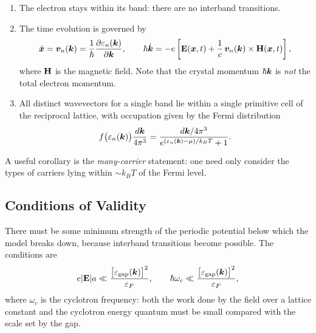 \begin{fact}
\begin{enumerate}
    \item The electron stays within its band: there are no interband transitions.
    \item The time evolution is governed by
    \begin{equation}
        \dot{\lvect{x}} = \lvect{v}_n(\lvect{k}) = \frac{1}{\hbar}\pdv{\varepsilon_n(\lvect{k})}{\lvect{k}},
        \qquad
        \hbar \dot{\lvect{k}} = -e\left[ \cvect{E}(\lvect{x},t) + \frac{1}{c}\, \lvect{v}_n(\lvect{k}) \times \cvect{H}(\lvect{x},t) \right],
    \end{equation}
    where $\cvect{H}$ is the magnetic field. Note that the crystal momentum $\hbar\bm{k}$ is \emph{not} the total electron momentum.
    \item All distinct wavevectors for a single band lie within a single primitive cell of the reciprocal lattice, with occupation given by the Fermi distribution
    \begin{equation}
        f\bigl(\varepsilon_n(\bm{k})\bigr) \frac{d\bm{k}}{4\pi^3}
        = \frac{d\bm{k}/4\pi^3}{e^{(\varepsilon_n(\bm{k})-\mu)/k_B T}+1}.
    \end{equation}
\end{enumerate}
\end{fact}

A useful corollary is the \emph{many-carrier} statement: one need only consider the types of carriers lying within $\sim k_B T$ of the Fermi level.

\subsection{Conditions of Validity}

There must be some minimum strength of the periodic potential below which the model breaks down, because interband transitions become possible. The conditions are
\begin{equation}
    e |\cvect{E}| a \ll \frac{\bigl[\varepsilon_{\text{gap}}(\lvect{k})\bigr]^2}{\varepsilon_F},
    \qquad
    \hbar\omega_c \ll \frac{\bigl[\varepsilon_{\text{gap}}(\lvect{k})\bigr]^2}{\varepsilon_F},
\end{equation}
where $\omega_c$ is the cyclotron frequency: both the work done by the field over a lattice constant and the cyclotron energy quantum must be small compared with the scale set by the gap.

